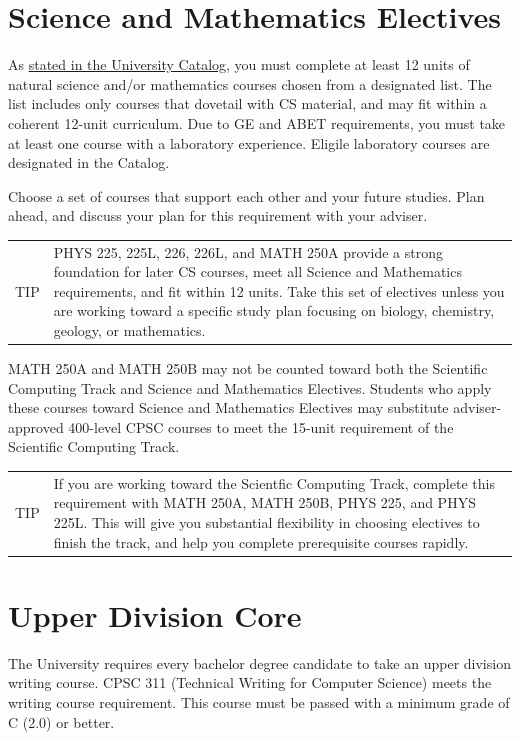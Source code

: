 \documentclass{book}
\newenvironment{tip}
               {\tcolorbox \begin{tabular}{m{.5in} m{5in}} \Large{TIP} & }
               {\end{tabular} \endtcolorbox}
\begin{document}
\section{Science and Mathematics Electives}

As \href{http://catalog.fullerton.edu/preview_program.php?catoid=2&poid=537&returnto=137}{stated in the University Catalog}, you must complete at least 12 units of natural science and/or mathematics courses chosen from a designated list. The list includes only courses that dovetail with CS material, and may fit within a coherent 12-unit curriculum. Due to GE and ABET requirements, you must take at least one course with a laboratory experience. Eligile laboratory courses are designated in the Catalog.

Choose a set of courses that support each other and your future studies. Plan ahead, and discuss your plan for this requirement with your adviser.

\begin{tip}
PHYS 225, 225L, 226, 226L, and MATH 250A provide a strong foundation for later CS courses, meet all Science and Mathematics requirements, and fit within 12 units. Take this set of electives unless you are working toward a specific study plan focusing on biology, chemistry, geology, or mathematics.
\end{tip}

MATH 250A and MATH 250B may not be counted toward both the Scientific Computing Track  and Science and Mathematics Electives. Students who apply these courses toward Science and Mathematics Electives may substitute adviser-approved 400-level CPSC courses to meet the 15-unit requirement of the Scientific Computing Track.

\begin{tip}
If you are working toward the Scientfic Computing Track, complete this requirement with  MATH 250A, MATH 250B, PHYS 225, and PHYS 225L. This will give you substantial flexibility in choosing electives to finish the track, and help you complete prerequisite courses rapidly.
\end{tip}

\section{Upper Division Core}

The University requires every bachelor degree candidate to take an upper division writing course. CPSC 311 (Technical Writing for Computer Science) meets the writing course requirement. This course must be passed with a minimum grade of C (2.0) or better.
\end{document}
